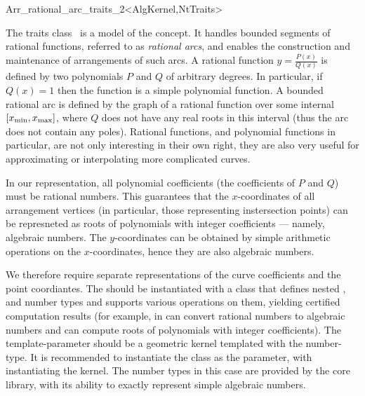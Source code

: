 
\ccRefPageBegin
\begin{ccRefClass}{Arr_rational_arc_traits_2<AlgKernel,NtTraits>}

\ccDefinition

The traits class \ccRefName\ is a model of the 
concept. It handles bounded segments of rational functions, referred to as
{\sl rational arcs}, and enables the construction and maintenance of
arrangements of such arcs. A rational function $y = \frac{P(x)}{Q(x)}$
is defined by two polynomials $P$ and $Q$ of arbitrary degrees. In
particular, if $Q(x) = 1$ then the function is a simple polynomial
function. A bounded rational arc is defined by the graph of a rational
function over some internal $[x_{\rm min}, x_{\rm max}]$, where $Q$
does not have any real roots in this interval (thus the arc does not
contain any poles). Rational functions, and polynomial functions in
particular, are not only interesting in their own right, they are also
very useful for approximating or interpolating more complicated curves.

In our representation, all polynomial coefficients (the coefficients of $P$
and $Q$) must be rational numbers. This guarantees that the
$x$-coordinates of all arrangement vertices (in particular, those
representing instersection points) can be represneted as roots of
polynomials with integer coefficients --- namely, algebraic numbers.
The $y$-coordinates can be obtained by simple arithmetic operations on
the $x$-coordinates, hence they are also algebraic numbers.

We therefore require separate representations of the curve coefficients and
the point coordiantes. The  should be instantiated with a class
that defines nested ,  and  number
types and supports various operations on them, yielding certified computation
results (for example, in can convert rational numbers to algebraic numbers
and can compute roots of polynomials with integer coefficients).
The  template-parameter should be a geometric kernel templated
with the  number-type. It is recommended to
instantiate the  class as the 
parameter, with  instantiating the kernel.
The number types in this case are provided by the {\sc core} library, with its
ability to exactly represent simple algebraic numbers.


\end{ccRefClass}
